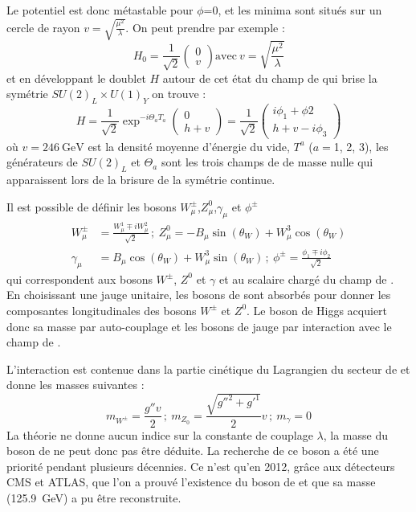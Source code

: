 Le potentiel est donc métastable pour $\phi$=0, et les minima sont situés sur un cercle de rayon $v=\sqrt{\frac{\mu^{2}}{\lambda}}$. On peut prendre par exemple :
\begin{equation}
H_{0}=\frac{1}{\sqrt{2}}\begin{pmatrix} 
0\\
v
\end{pmatrix} \text{avec} \ v=\sqrt{\frac{\mu^{2}}{\lambda}}
\end{equation}
et en développant le doublet $H$ autour de cet état du champ de  qui brise la symétrie $SU(2)_{L}\times U(1)_{Y}$ on trouve : 
\begin{equation}
H=\frac{1}{\sqrt{2}}\exp^{-i\Theta_{a}T_{a}}\begin{pmatrix} 
0\\
h+v
\end{pmatrix}=\frac{1}{\sqrt{2}}\begin{pmatrix} 
i\phi_{1}+\phi{2}\\
h+v-i\phi_{3}
\end{pmatrix}
\end{equation}
où $v=\SI{246}{\giga\eV}$ est la densité moyenne d'énergie du vide, $T^{a}$ ($a=$\num{1}, \num{2}, \num{3}), les générateurs de $SU(2)_{L}$ et $\Theta_{a}$ sont les trois champs de  de masse nulle qui apparaissent lors de la brisure de la symétrie continue.

Il est possible de définir les bosons $W_{\mu}^{\pm}$,$Z_{\mu}^{0}$,$\gamma_{\mu}$ et $\phi^{\pm}$ 
\begin{equation}
\begin{split}
W_{\mu}^{\pm}&=\frac{W_{\mu}^{1}\mp iW_{\mu}^{2}}{\sqrt{2}}\,; \ Z_{\mu}^{0}=-B_{\mu}\sin(\theta_{W})+W_{\mu}^{3}\cos(\theta_{W})\\
\gamma_{\mu}&=B_{\mu}\cos(\theta_{W})+W_{\mu}^{3}\sin(\theta_{W})\, ; \ \phi^{\pm}=\frac{\phi_{1}\mp i\phi_{2}}{\sqrt{2}}
\end{split}
\end{equation}
qui correspondent aux bosons $W^{\pm}$, $Z^{0}$ et $\gamma$ et au scalaire chargé du champ de . En choisissant une jauge unitaire, les bosons de  sont absorbés pour donner les composantes longitudinales des bosons $W^{\pm}$ et $Z^{0}$. Le boson de Higgs acquiert donc sa masse par auto-couplage et les bosons de jauge par interaction avec le champ de .

L'interaction est contenue dans la partie cinétique du Lagrangien du secteur de  et donne les masses suivantes : 
\begin{equation}
m_{W^{\pm}}=\frac{g''v}{2}\,; \  m_{Z_{0}}=\frac{\sqrt{g''^{2}+g'^{1}}}{2}v\,; \  m_{\gamma}=0 
\end{equation} 
La théorie ne donne aucun indice sur la constante de couplage $\lambda$, la masse du boson de  ne peut donc pas être déduite. La recherche de ce boson a été une priorité pendant plusieurs décennies. Ce n'est qu'en \num{2012}, grâce aux détecteurs CMS et ATLAS, que l'on a prouvé l'existence du boson de  et que sa masse (\SI{125.9}{\giga\eV}) a pu être reconstruite. 

